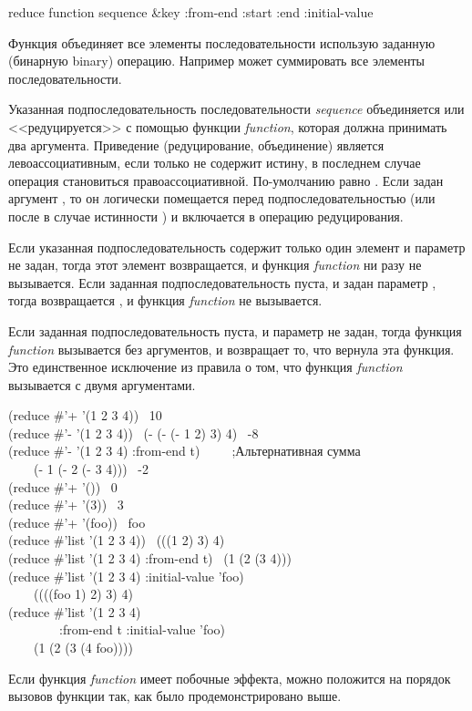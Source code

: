 \begin{defun}[Функция]
reduce function sequence &key :from-end :start :end :initial-value

Функция  объединяет все элементы последовательности использую
заданную (бинарную binary) операцию. Например \cdf{+} может суммировать все
элементы последовательности.

Указанная подпоследовательность последовательности \emph{sequence} объединяется
или <<редуцируется>> с помощью функции \emph{function}, которая должна принимать
два аргумента. Приведение (редуцирование, объединение) является
левоассоциативным, если только  не содержит истину, в последнем
случае операция становиться правоассоциативной. По-умолчанию
 равно {\nil}.
Если задан аргумент , то он логически помещается перед
подпоследовательностью (или после в случае истинности ) и
включается в операцию редуцирования.

Если указанная подпоследовательность содержит только один элемент и параметр
 не задан, тогда этот элемент возвращается, и функция
\emph{function} ни разу не вызывается.
Если заданная подпоследовательность пуста, и задан параметр ,
тогда возвращается , и функция \emph{function} не вызывается.

Если заданная подпоследовательность пуста, и параметр  не задан,
тогда функция \emph{function} вызывается без аргументов, и 
возвращает то, что вернула эта функция. Это единственное исключение из правила о
том, что функция \emph{function} вызывается с двумя аргументами.

\begin{lisp}
(reduce \#'+ '(1 2 3 4)) \EV\ 10 \\
(reduce \#'- '(1 2 3 4)) \EQ\ (- (- (- 1 2) 3) 4) \EV\ -8 \\
(reduce \#'- '(1 2 3 4) :from-end t)~~~~~;\textrm{Альтернативная сумма} \\
~~~\EQ\ (- 1 (- 2 (- 3 4))) \EV\ -2 \\
(reduce \#'+ '()) \EV\ 0 \\
(reduce \#'+ '(3)) \EV\ 3 \\
(reduce \#'+ '(foo)) \EV\ foo \\
(reduce \#'list '(1 2 3 4)) \EV\ (((1 2) 3) 4) \\
(reduce \#'list '(1 2 3 4) :from-end t) \EV\ (1 (2 (3 4))) \\
(reduce \#'list '(1 2 3 4) :initial-value 'foo) \\
~~~\EV\ ((((foo 1) 2) 3) 4) \\
(reduce \#'list '(1 2 3 4) \\
~~~~~~~~:from-end t :initial-value 'foo) \\
~~~\EV\ (1 (2 (3 (4 foo))))
\end{lisp}
Если функция \emph{function} имеет побочные эффекта, можно положится на порядок
вызовов функции так, как было продемонстрировано выше.


\end{defun}
